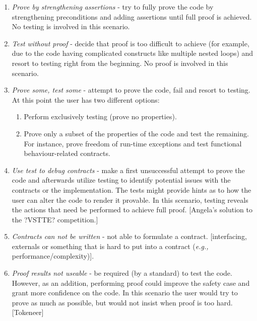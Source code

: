 \documentclass{llncs}
\newcommand{\eg}{\textit{e.g.,}\xspace}
\begin{document}
\begin {enumerate}
\item \emph{Prove by strengthening assertions} - try to fully prove
  the code by strengthening preconditions and adding assertions until
  full proof is achieved. No testing is involved in this scenario.

\item \emph{Test without proof} - decide that proof is too difficult
  to achieve (for example, due to the code having complicated
  constructs like multiple nested loops) and resort to testing right
  from the beginning. No proof is involved in this scenario.

\item \emph{Prove some, test some} - attempt to prove the code, fail
  and resort to testing. At this point the user has two different
  options:

  \begin{enumerate}
  \item Perform exclusively testing (prove no properties).

  \item Prove only a subset of the properties of the code and test the
    remaining. For instance, prove freedom of run-time exceptions and
    test functional behaviour-related contracts.
  \end{enumerate}

\item \emph{Use test to debug contracts} - make a first unsuccessful
  attempt to prove the code and afterwards utilize testing to identify
  potential issues with the contracts or the implementation. The tests
  might provide hints as to how the user can alter the code to render
  it provable. In this scenario, testing reveals the actions that need
  be performed to achieve full proof. [Angela's solution to the
  ?VSTTE? competition.]

\item \emph{Contracts can not be written} - not able to formulate a
  contract. [interfacing, externals or something that is hard to put
  into a contract (\eg performance/complexity)].

\item \emph{Proof results not useable} - be required (by a standard)
  to test the code. However, as an addition, performing proof could
  improve the safety case and grant more confidence on the code. In
  this scenario the user would try to prove as much as possible, but
  would not insist when proof is too hard. [Tokeneer]
\end{enumerate}
\end{document}
